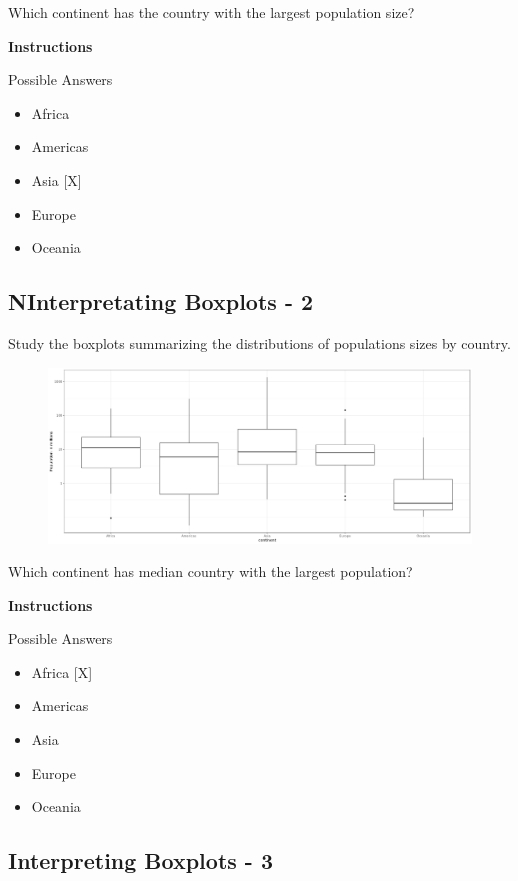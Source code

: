 \documentclass[]{article}
\providecommand{\tightlist}{%
  \setlength{\itemsep}{0pt}\setlength{\parskip}{0pt}}
\begin{document}
Which continent has the country with the largest population size?

\textbf{Instructions}

Possible Answers

\begin{itemize}
\tightlist
\item
  Africa
\item
  Americas
\item
  Asia {[}X{]}
\item
  Europe
\item
  Oceania
\end{itemize}

\subsection{\texorpdfstring{\textbf{NInterpretating Boxplots -
2}}{NInterpretating Boxplots - 2}}\label{ninterpretating-boxplots---2}

Study the boxplots summarizing the distributions of populations sizes by
country.

\begin{figure}
\centering
\includegraphics{img1.png}
\caption{}
\end{figure}

Which continent has median country with the largest population?

\textbf{Instructions}

Possible Answers

\begin{itemize}
\tightlist
\item
  Africa {[}X{]}
\item
  Americas
\item
  Asia
\item
  Europe
\item
  Oceania
\end{itemize}

\subsection{\texorpdfstring{\textbf{Interpreting Boxplots -
3}}{Interpreting Boxplots - 3}}\label{interpreting-boxplots---3}
\end{document}
